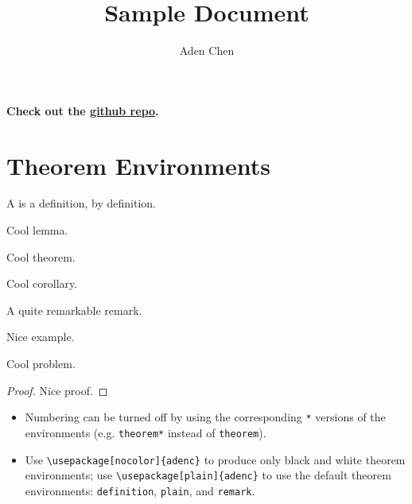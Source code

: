 \documentclass[10pt,letterpaper]{amsart}
\title{Sample Document}
\author{Aden Chen}
\begin{document}
\maketitle

\tableofcontents

\noindent
\textbf{Check out the \href{https://github.com/AdenChen27/latex}{github repo}. }

\section{Theorem Environments}

\begin{definition}
  A  is a definition, by definition. 
\end{definition}

\begin{lemma}
  Cool lemma. 
\end{lemma}

\begin{theorem}
  Cool theorem. 
\end{theorem}

\begin{corollary}
  Cool corollary. 
\end{corollary}

\begin{remark}
  A quite remarkable remark. 
\end{remark}

\begin{example}
  Nice example. 
\end{example}

\begin{problem}
  Cool problem. 
\end{problem}

\begin{proof}
  Nice proof.
\end{proof}

\begin{itemize}
  \item Numbering can be turned off by using the corresponding \verb|*| versions of the environments (e.g. \verb|theorem*| instead of \verb|theorem|). 
  \item Use \verb|\usepackage[nocolor]{adenc}| to produce only black and white theorem environments; use \verb|\usepackage[plain]{adenc}|  to use the default theorem environments: \texttt{definition}, \texttt{plain}, and \texttt{remark}.
\end{itemize}
\end{document}
